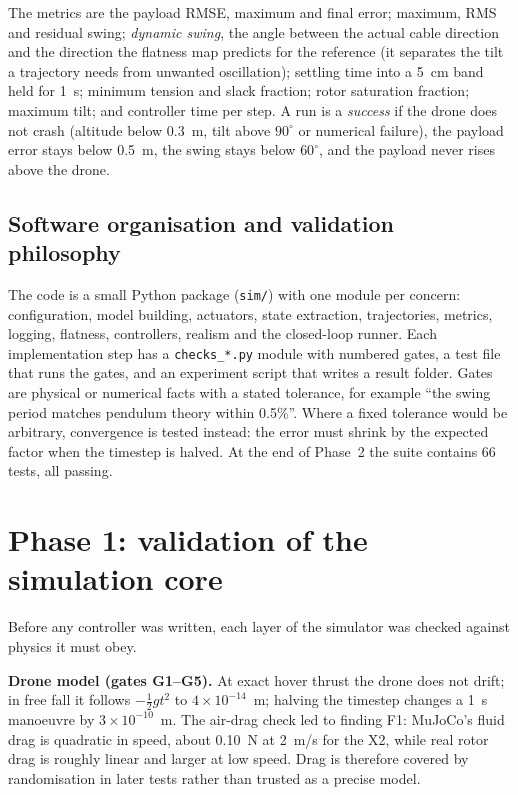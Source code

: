 \documentclass[11pt,a4paper]{article}
\newcommand{\code}[1]{\texttt{\small #1}}
\begin{document}
The metrics are the payload RMSE, maximum and final error; maximum, RMS and residual swing; \emph{dynamic swing}, the
angle between the actual cable direction and the direction the flatness map predicts for the reference (it separates the
tilt a trajectory needs from unwanted oscillation); settling time into a 5~cm band held for 1~s; minimum tension and
slack fraction; rotor saturation fraction; maximum tilt; and controller time per step. A run is a \emph{success} if the
drone does not crash (altitude below 0.3~m, tilt above $90^\circ$ or numerical failure), the payload error stays below
0.5~m, the swing stays below $60^\circ$, and the payload never rises above the drone.

\subsection{Software organisation and validation philosophy}
The code is a small Python package (\code{sim/}) with one module per concern: configuration, model building, actuators,
state extraction, trajectories, metrics, logging, flatness, controllers, realism and the closed-loop runner. Each
implementation step has a \code{checks\_*.py} module with numbered gates, a test file that runs the gates, and an
experiment script that writes a result folder. Gates are physical or numerical facts with a stated tolerance, for example
``the swing period matches pendulum theory within 0.5\%''. Where a fixed tolerance would be arbitrary, convergence is
tested instead: the error must shrink by the expected factor when the timestep is halved. At the end of Phase~2 the suite
contains 66 tests, all passing.

\section{Phase 1: validation of the simulation core}
\label{sec:phase1}

Before any controller was written, each layer of the simulator was checked against physics it must obey.

\textbf{Drone model (gates G1--G5).} At exact hover thrust the drone does not drift; in free fall it follows
$-\tfrac12 g t^2$ to $4\times10^{-14}$~m; halving the timestep changes a 1~s manoeuvre by $3\times10^{-10}$~m.
The air-drag check led to finding F1: MuJoCo's fluid drag is quadratic in speed, about 0.10~N at 2~m/s for the X2, while
real rotor drag is roughly linear and larger at low speed. Drag is therefore covered by randomisation in later tests
rather than trusted as a precise model.
\end{document}
